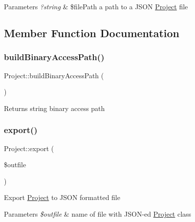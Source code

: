 \begin{DoxyParams}{Parameters}
{\em ?string} & \$file\+Path a path to a J\+S\+ON \hyperlink{classProject}{Project} file \\
\hline
\end{DoxyParams}


\subsection{Member Function Documentation}
\mbox{\label{classProject_aba3771ee0f7928f720510eea8a6b3337}} 
\subsubsection{\texorpdfstring{build\+Binary\+Access\+Path()}{buildBinaryAccessPath()}}
{\footnotesize\ttfamily Project\+::build\+Binary\+Access\+Path (\begin{DoxyParamCaption}{ }\end{DoxyParamCaption})}

\begin{DoxyReturn}{Returns}
string binary access path 
\end{DoxyReturn}
\mbox{\label{classProject_af50a24af7524ef28c4d7b39f53153498}} 
\subsubsection{\texorpdfstring{export()}{export()}}
{\footnotesize\ttfamily Project\+::export (\begin{DoxyParamCaption}\item[{string}]{\$outfile }\end{DoxyParamCaption})}

Export \hyperlink{classProject}{Project} to J\+S\+ON formatted file 
\begin{DoxyParams}{Parameters}
{\em \$outfile} & name of file with J\+S\+O\+N-\/ed \hyperlink{classProject}{Project} class \\
\hline
\end{DoxyParams}
\mbox{\label{classProject_a5c9ad606315d82f9d09c5fef29b930e2}} 
